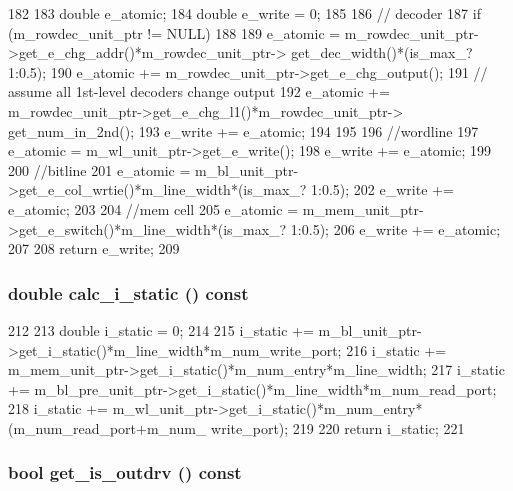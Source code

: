 \begin{DoxyCode}
182 {
183     double e_atomic;
184     double e_write = 0;
185 
186     // decoder
187     if (m_rowdec_unit_ptr != NULL)
188     {
189         e_atomic = m_rowdec_unit_ptr->get_e_chg_addr()*m_rowdec_unit_ptr->
      get_dec_width()*(is_max_? 1:0.5);
190         e_atomic += m_rowdec_unit_ptr->get_e_chg_output();
191         // assume all 1st-level decoders change output
192         e_atomic += m_rowdec_unit_ptr->get_e_chg_l1()*m_rowdec_unit_ptr->
      get_num_in_2nd();
193         e_write += e_atomic;
194     }
195 
196     //wordline
197     e_atomic = m_wl_unit_ptr->get_e_write();
198     e_write += e_atomic;
199 
200     //bitline
201     e_atomic = m_bl_unit_ptr->get_e_col_wrtie()*m_line_width*(is_max_? 1:0.5);
202     e_write += e_atomic;
203 
204     //mem cell
205     e_atomic = m_mem_unit_ptr->get_e_switch()*m_line_width*(is_max_? 1:0.5);
206     e_write += e_atomic;
207 
208     return e_write;
209 }
\end{DoxyCode}
\hypertarget{classSRAM_aad1d8e72e5083614a20373b700754f6a}{
\subsubsection[{calc\_\-i\_\-static}]{\setlength{\rightskip}{0pt plus 5cm}double calc\_\-i\_\-static () const}}
\label{classSRAM_aad1d8e72e5083614a20373b700754f6a}



\begin{DoxyCode}
212 {
213     double i_static = 0;
214 
215     i_static += m_bl_unit_ptr->get_i_static()*m_line_width*m_num_write_port;
216     i_static += m_mem_unit_ptr->get_i_static()*m_num_entry*m_line_width;
217     i_static += m_bl_pre_unit_ptr->get_i_static()*m_line_width*m_num_read_port;
218     i_static += m_wl_unit_ptr->get_i_static()*m_num_entry*(m_num_read_port+m_num_
      write_port);
219 
220     return i_static;
221 }
\end{DoxyCode}
\hypertarget{classSRAM_aeae566aacd01a41f66fda87cb0fd9778}{
\subsubsection[{get\_\-is\_\-outdrv}]{\setlength{\rightskip}{0pt plus 5cm}bool get\_\-is\_\-outdrv () const}}
\label{classSRAM_aeae566aacd01a41f66fda87cb0fd9778}



